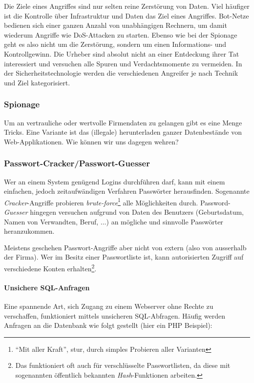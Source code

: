 Die Ziele eines Angriffes sind nur selten reine Zerstörung von Daten. Viel
häufiger ist die Kontrolle über Infrastruktur und Daten das Ziel eines
Angriffes. Bot-Netze bedienen sich einer ganzen Anzahl von unabhängigen
Rechnern, um damit wiederum Angriffe wie DoS-Attacken 
zu starten. Ebenso
wie bei der Spionage geht es also nicht um die Zerstörung, sondern um
einen Informations- und Kontrollgewinn. Die Urheber sind absolut nicht
an einer Entdeckung ihrer Tat interessiert und versuchen alle Spuren und
Verdachtsmomente zu vermeiden. In der Sicherheitstechnologie werden die
verschiedenen Angreifer je nach Technik und Ziel kategorisiert.

\subsubsection*{Spionage}

Um an vertrauliche oder wertvolle Firmendaten zu gelangen gibt es eine Menge
Tricks. Eine Variante ist das (illegale) herunterladen ganzer Datenbestände
von Web-Applikationen. Wie können wir uns dagegen wehren?

\subsubsection*{Passwort-Cracker/Passwort-Guesser}
\label{subsubsec:password-cracker}

Wer an einem System genügend Logins durchführen darf, kann mit einem einfachen,
jedoch zeitaufwändigen Verfahren Passwörter herausfinden. Sogenannte
\emph{Cracker}-Angriffe probieren \emph{brute-force}\footnote{``Mit aller Kraft'',
stur, durch simples Probieren aller Varianten}
alle Möglichkeiten durch. Password-\emph{Guesser} hingegen versuchen aufgrund
von Daten des Benutzers (Geburtsdatum, Namen von Verwandten, Beruf, $\ldots$)
an mögliche und sinnvolle Passwörter heranzukommen.

Meistens geschehen Passwort-Angriffe aber nicht von extern (also von ausserhalb
der Firma). Wer im Besitz einer Passwortliste ist, kann autorisierten Zugriff
auf verschiedene Konten erhalten\footnote{Das funktioniert oft auch für
verschlüsselte Passwortlisten, da diese mit sogenannten öffentlich bekannten
\emph{Hash}-Funktionen arbeiten.}.

\paragraph*{Unsichere SQL-Anfragen}
Eine spannende Art, sich Zugang zu einem Webserver ohne Rechte zu verschaffen,
funktioniert mittels unsicheren SQL-Abfragen. Häufig werden Anfragen an die
Datenbank wie folgt gestellt (hier ein PHP Beispiel):

